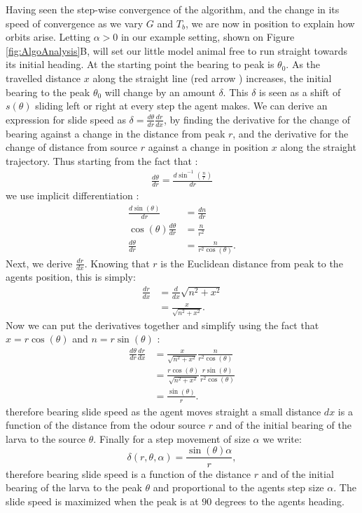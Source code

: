  
Having seen the step-wise convergence of the algorithm, and the change in its speed of convergence as we vary $G$ and $T_b$, we are now in position to explain how orbits arise.
Letting $\alpha > 0$ in our example setting, shown on Figure \ref{fig:AlgoAnalysis}B, will set our little model animal free to run straight towards its initial heading. At the starting point the bearing to peak is $\theta_0$. As the travelled distance $x$ along the straight line (red arrow ) increases, the initial bearing to the peak $\theta_0$ will change by an amount $\delta$. 
This $\delta$ is seen as a shift of $s(\theta)$ sliding left or right at every step the agent makes. 
We can derive an expression for slide speed as $\delta = \frac{d\theta}{dr}\frac{dr}{dx} $, by finding the derivative for the change of bearing against a change in the distance from peak $r$, and the derivative for the change of distance from source $r$ against a change in position $x$ along the straight trajectory. Thus starting from the fact that : 
\begin{align}
\frac{d\theta}{dr} = \frac{d\sin^{-1}(\frac{n}{r})}{dr}
\end{align}
 we use implicit differentiation :
\begin{align}
\frac{d \sin(\theta)}{dr} &= \frac{d n}{d r}\\
\cos(\theta) \frac{d \theta}{dr} &= \frac{n}{r^2}\\
\frac{d \theta}{dr} &= \frac{n}{r^2 \cos(\theta) }.
\end{align}
Next, we derive $\frac{dr}{dx}$. Knowing that $r$ is the Euclidean distance from peak to the agents position, this is simply:
\begin{align}
\frac{dr}{dx} &= \frac{d}{dx}\sqrt{n^2+x^2}\\
&=\frac{x}{\sqrt{n^2+x^2}}.
\end{align}
 Now we can put the derivatives together and simplify using the fact that $x=r \cos(\theta)$ and $n=r \sin(\theta)$ :
\begin{align}
\frac{d \theta}{dr}\frac{dr}{dx} &= \frac{x}{\sqrt{n^2+x^2}} \frac{n}{r^2 \cos(\theta) } \\
&= \frac{r \cos(\theta)}{\sqrt{n^2+x^2}} \frac{r \sin(\theta)}{r^2 \cos(\theta) }\\
&= \frac{\sin(\theta)}{r}.
\end{align}
therefore bearing slide speed as the agent moves straight  a small distance $dx$ is a function of the distance from the odour source $r$ and of the initial bearing of the larva to the source $\theta$.
 Finally for a step movement of size $\alpha$ we write:
\begin{equation}
\delta(r,\theta,\alpha) = \frac{\sin(\theta)\alpha}{r},
\label{eq:driftSpeed}
\end{equation}
therefore bearing slide speed is a function of the distance $r$ and of the initial bearing of the larva to the peak $\theta$ and proportional to the agents step size $\alpha$. The slide speed is maximized when the peak is at $90$ degrees to the agents heading.


